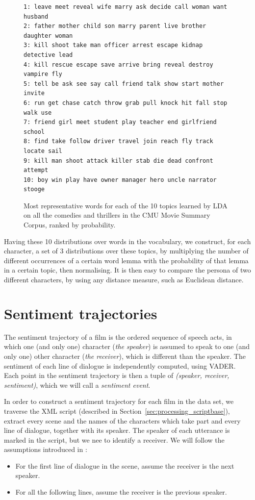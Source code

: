 \documentclass[bsc,frontabs,singlespacing,parskip, twoside]{infthesis}
\begin{document}
\begin{figure}[h]
\begin{minipage}{14.6cm}
\begin{Verbatim}[frame=single]
1: leave meet reveal wife marry ask decide call woman want husband
2: father mother child son marry parent live brother daughter woman
3: kill shoot take man officer arrest escape kidnap detective lead
4: kill rescue escape save arrive bring reveal destroy vampire fly
5: tell be ask see say call friend talk show start mother invite
6: run get chase catch throw grab pull knock hit fall stop walk use
7: friend girl meet student play teacher end girlfriend school 
8: find take follow driver travel join reach fly track locate sail
9: kill man shoot attack killer stab die dead confront attempt
10: boy win play have owner manager hero uncle narrator stooge
\end{Verbatim}
\end{minipage}
\caption{Most representative words for each of the 10 topics learned by LDA on all the comedies and thrillers in the CMU Movie Summary Corpus, ranked by probability.}
\label{topics}
\end{figure}

Having these 10 distributions over words in the vocabulary, we construct, for each character, a set of 3 distributions over these topics, by multiplying the number of different occurrences of a certain word lemma with the probability of that lemma in a certain topic, then normalising. It is then easy to compare the persona of two different characters, by using any distance measure, such as Euclidean distance.


\section{Sentiment trajectories}
The sentiment trajectory of a film is the ordered sequence of speech acts, in which one (and only one) character (\textit{the speaker}) is assumed to speak to one (and only one) other character (\textit{the receiver}), which is different than the speaker. The sentiment of each line of dialogue is independently computed, using VADER. Each point in the sentiment trajectory is then a tuple of \textit{(speaker, receiver, sentiment)}, which we will call a \textit{sentiment event}.

In order to construct a sentiment trajectory for each film in the data set, we traverse the XML script (described in Section~\ref{sec:processing_scriptbase}), extract every scene and the names of the characters which take part and every line of dialogue, together with its speaker. The speaker of each utterance is marked in the script, but we nee to identify a receiver. We will follow the assumptions introduced in \cite{Nalisnick2013}:
\begin{itemize}
	\item For the first line of dialogue in the scene, assume the receiver is the next speaker.
	\item For all the following lines, assume the receiver is the previous speaker.
\end{itemize}
\end{document}
